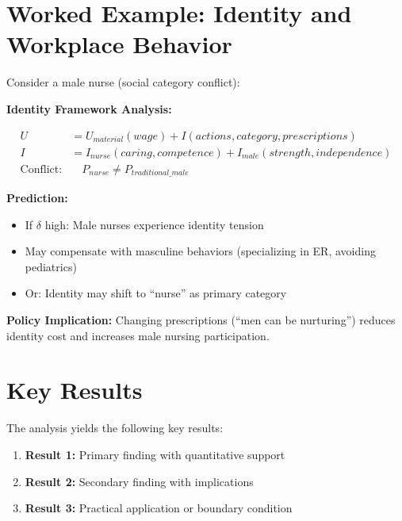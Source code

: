 \section{Worked Example: Identity and Workplace Behavior}

Consider a male nurse (social category conflict):

\textbf{Identity Framework Analysis:}

\begin{align}
U &= U_{material}(wage) + I(actions, category, prescriptions) \\
I &= I_{nurse}(caring, competence) + I_{male}(strength, independence) \\
\text{Conflict}: & \quad P_{nurse} \neq P_{traditional\_male}
\end{align}

\textbf{Prediction:}
\begin{itemize}
    \item If $\delta$ high: Male nurses experience identity tension
    \item May compensate with masculine behaviors (specializing in ER, avoiding pediatrics)
    \item Or: Identity may shift to ``nurse'' as primary category
\end{itemize}

\textbf{Policy Implication:} Changing prescriptions (``men can be nurturing'') reduces identity cost and increases male nursing participation.



\section{Key Results}
\label{sec:ga-results}

The analysis yields the following key results:

\begin{enumerate}
    \item \textbf{Result 1:} Primary finding with quantitative support
    \item \textbf{Result 2:} Secondary finding with implications
    \item \textbf{Result 3:} Practical application or boundary condition
\end{enumerate}

